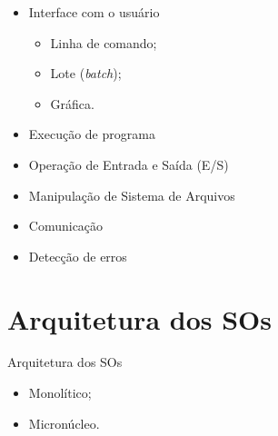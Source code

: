 \begin{frame}{\sectiontitle}
  \begin{itemize}
  \item Interface com o usuário
    \begin{itemize}
    \item Linha de comando;
    \item Lote ({\em batch});
    \item Gráfica.
    \end{itemize}
  \item Execução de programa
  \item Operação de Entrada e Saída (E/S)
  \item Manipulação de Sistema de Arquivos
  \item Comunicação
  \item Detecção de erros
\end{itemize}
  
\end{frame}

\def\sectiontitle{Arquitetura dos SOs}

\section{\sectiontitle}

\begin{frame}{\sectiontitle}
  \begin{itemize}
  \item Monolítico;
  \item Micronúcleo.
  \end{itemize}
\end{frame}


